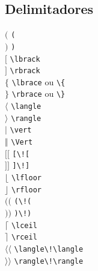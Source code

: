 \documentclass[xindy,rascunho]{fei}
\begin{document}
\begin{teorema}
\section{Delimitadores}
\begin{multicols}{3}
\noindent
\((\) \verb+(+\\
\()\) \verb+)+\\
\(\lbrack\) \verb+\lbrack+\\
\(\rbrack\) \verb+\rbrack+\\
\(\lbrace\) \verb+\lbrace+ ou \verb+\{+\\
\(\rbrace\) \verb+\rbrace+ ou \verb+\}+\\
\(\langle\) \verb+\langle+\\
\(\rangle\) \verb+\rangle+\\
\(\vert\) \verb+\vert+\\
\(\Vert\) \verb+\Vert+\\
\([\![\) \verb+[\![+\\
\(]\!]\) \verb+]\!]+\\
\(\lfloor\) \verb+\lfloor+\\
\(\rfloor\) \verb+\rfloor+\\
\((\!(\) \verb+(\!(+\\
\()\!)\) \verb+)\!)+\\
\(\lceil\) \verb+\lceil+\\
\(\rceil\) \verb+\rceil+\\
\(\langle\!\langle\) \verb+\langle\!\langle+\\
\(\rangle\!\rangle\) \verb+\rangle\!\rangle+\\
\end{multicols}


\end{teorema}
\end{document}
